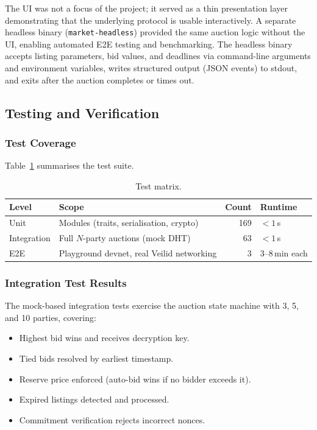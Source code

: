 The UI was not a focus of the project; it served as a thin presentation layer
demonstrating that the underlying protocol is usable interactively.  A
separate headless binary (\texttt{market-headless}) provided the same auction
logic without the UI, enabling automated E2E testing and benchmarking.  The
headless binary accepts listing parameters, bid values, and deadlines via
command-line arguments and environment variables, writes structured output
(JSON events) to stdout, and exits after the auction completes or times out.

\subsection{Testing and Verification}
\label{sec:results-testing}

\subsubsection{Test Coverage}

Table~\ref{tab:test-matrix} summarises the test suite.

\begin{table}[H]
\centering
\small
\begin{tabular}{llrl}
\toprule
\textbf{Level} & \textbf{Scope} & \textbf{Count} & \textbf{Runtime} \\
\midrule
Unit        & Modules (traits, serialisation, crypto) & 169 & $< 1$\,s \\
Integration & Full $N$-party auctions (mock DHT)      & 63  & $< 1$\,s \\
E2E         & Playground devnet, real Veilid networking & 3           & 3--8\,min each \\
\bottomrule
\end{tabular}
\caption{Test matrix.}
\label{tab:test-matrix}
\end{table}

\subsubsection{Integration Test Results}

The mock-based integration tests exercise the auction state machine with
3, 5, and 10 parties, covering:
\begin{itemize}[noitemsep]
  \item Highest bid wins and receives decryption key.
  \item Tied bids resolved by earliest timestamp.
  \item Reserve price enforced (auto-bid wins if no bidder exceeds it).
  \item Expired listings detected and processed.
  \item Commitment verification rejects incorrect nonces.
\end{itemize}

